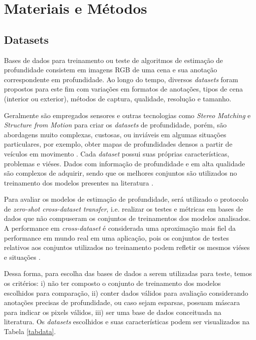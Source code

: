 
\chapter{Materiais e Métodos}

\section{Datasets}

Bases de dados para treinamento ou teste de algoritmos de estimação de profundidade consistem em imagens RGB de uma cena e sua anotação correspondente em profundidade. Ao longo do tempo, diversos \textit{datasets} foram propostos para este fim com variações em formatos de anotações, tipos de cena (interior ou exterior), métodos de captura, qualidade, resolução e tamanho.


Geralmente são empregados sensores e outras tecnologias como \textit{Stereo Matching} e \textit{Structure from Motion} para criar os \textit{datasets} de profundidade, porém, são abordagens muito complexas, custosas, ou inviáveis em algumas situações particulares, por exemplo, obter mapas de profundidades densos a partir de veículos em movimento  \cite{yang2024depthv1}.
Cada \textit{dataset} possui suas próprias características, problemas e viéses. Dados com informação de profundidade e em alta qualidade são complexos de adquirir, sendo que os melhores conjuntos são utilizados no treinamento dos modelos presentes na literatura \cite{ranftl2020towards}. 

Para avaliar os modelos de estimação de profundidade, será utilizado o protocolo de \textit{zero-shot cross-dataset transfer}, i.e. realizar os testes e métricas em bases de dados que não compuseram os conjuntos de treinamentos dos modelos analisados. A performance em \textit{cross-dataset} é considerada uma aproximação mais fiel da performance em mundo real em uma aplicação, pois os conjuntos de testes relativos aos conjuntos utilizados no treinamento podem refletir os mesmos viéses e situações \cite{ranftl2020towards}.

Dessa forma, para escolha das bases de dados a serem utilizadas para teste, temos os critérios: i) não ter composto o conjunto de treinamento dos modelos escolhidos para comparação, ii) conter dados válidos para avaliação considerando anotações precisas de profundidade, ou caso sejam esparsas, possuam máscara para indicar os pixels válidos, iii) ser uma base de dados conceituada na literatura. Os \textit{datasets} escolhidos e suas características podem ser visualizados na Tabela \ref{tabdata}.

